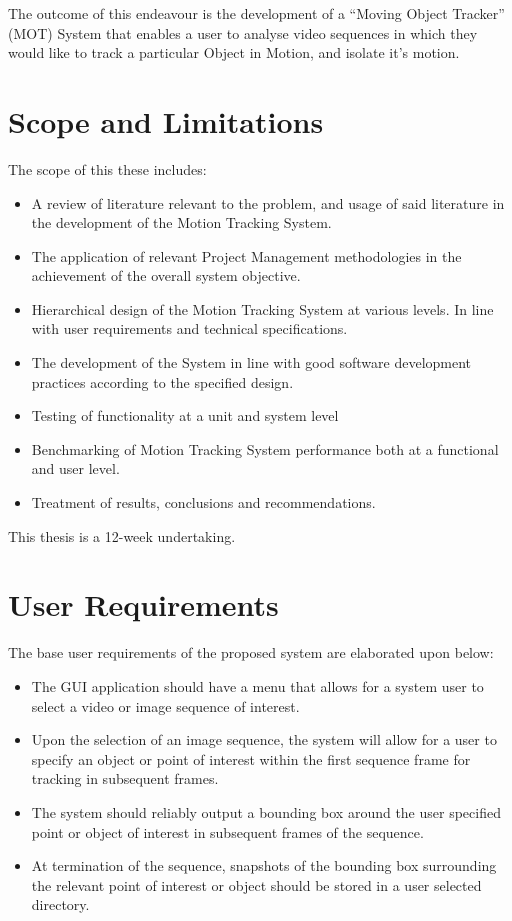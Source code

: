 The outcome of this endeavour is the development of a ``Moving Object Tracker''
(MOT) System that enables a user to analyse video sequences in which they would like
to track a particular Object in Motion, and isolate it's motion.

\section{Scope and Limitations}
The scope of this these includes: 
\begin{itemize}
    \item A review of literature relevant to the problem, and usage of
        said literature in the development of the Motion Tracking System.
    \item The application of relevant Project Management methodologies in the
        achievement of the overall system objective.
    \item Hierarchical design of the Motion Tracking System at various levels.
        In line with user requirements and technical specifications.
    \item The development of the System in line with good software development
        practices according to the specified design.
    \item Testing of functionality at a unit and system level
    \item Benchmarking of Motion Tracking System performance both at a
        functional and user level.
    \item Treatment of results, conclusions and recommendations.
\end{itemize}

This thesis is a 12-week undertaking.

\section{User Requirements}\label{introduction_user_requirements}
The base user requirements of the proposed system are elaborated upon below:
\begin{itemize}
    \item The GUI application should have a menu that allows for a system
        user to select a video or image sequence of interest.
    \item Upon the selection of an image sequence, the system will allow for a
        user to specify an object or point of interest within the first sequence
        frame for tracking in subsequent frames.
    \item The system should reliably output a bounding box around the user
        specified point or object of interest in subsequent frames of the
        sequence. 
    \item At termination of the sequence, snapshots of the bounding box
        surrounding the relevant point of interest or object should be stored in
        a user selected directory.
\end{itemize}

